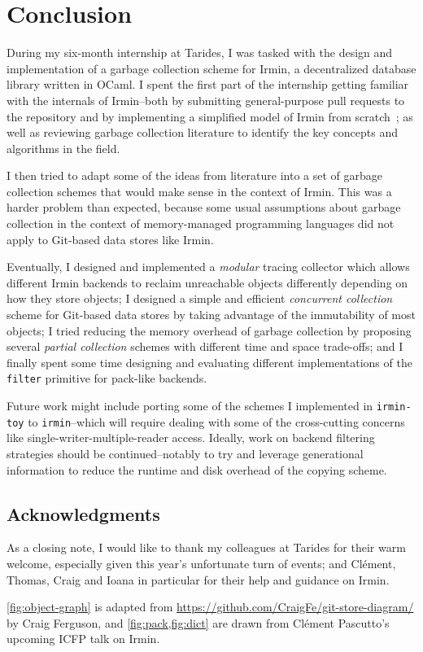 \section*{Conclusion}

During my six-month internship at Tarides, I was tasked with the design and implementation of a garbage collection scheme for Irmin, a decentralized database library written in OCaml. I spent the first part of the internship getting familiar with the internals of Irmin--both by submitting general-purpose pull requests to the repository and by implementing a simplified model of Irmin from scratch~\cite{irmin-toy-github}; as well as reviewing garbage collection literature to identify the key concepts and algorithms in the field.

I then tried to adapt some of the ideas from literature into a set of garbage collection schemes that would make sense in the context of Irmin. This was a harder problem than expected, because some usual assumptions about garbage collection in the context of memory-managed programming languages did not apply to Git-based data stores like Irmin.

Eventually, I designed and implemented a \textit{modular} tracing collector which allows different Irmin backends to reclaim unreachable objects differently depending on how they store objects; I designed a simple and efficient \textit{concurrent collection} scheme for Git-based data stores by taking advantage of the immutability of most objects; I tried reducing the memory overhead of garbage collection by proposing several \textit{partial collection} schemes with different time and space trade-offs; and I finally spent some time designing and evaluating different implementations of the \texttt{filter} primitive for pack-like backends.

Future work might include porting some of the schemes I implemented in \texttt{irmin-toy} to \texttt{irmin}--which will require dealing with some of the cross-cutting concerns like single-writer-multiple-reader access. Ideally, work on backend filtering strategies should be continued--notably to try and leverage generational information to reduce the runtime and disk overhead of the copying scheme.

\subsection*{Acknowledgments}

As a closing note, I would like to thank my colleagues at Tarides for their warm welcome, especially given this year's unfortunate turn of events; and Clément, Thomas, Craig and Ioana in particular for their help and guidance on Irmin.

\cref{fig:object-graph} is adapted from \url{https://github.com/CraigFe/git-store-diagram/} by Craig Ferguson, and \cref{fig:pack,fig:dict} are drawn from Clément Pascutto's upcoming ICFP talk on Irmin.
